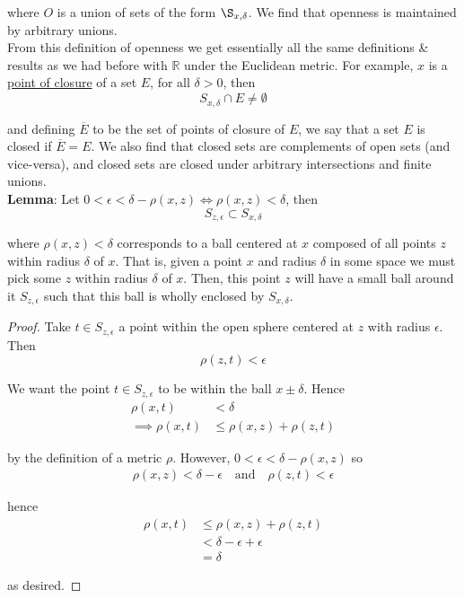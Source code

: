 \documentclass[12pt]{article}
\newlength\tindent
\renewcommand{\indent}{\hspace*{\tindent}}
\newcommand{\R}{\mathbb R}
\begin{document}
where $O$ is a union of sets of the form $\S_{x,\delta}$. We find that openness is maintained by arbitrary unions. \\

\indent From this definition of openness we get essentially all the same definitions \& results as we had before with $\R$ under the Euclidean metric. For example, $x$ is a \underline{point of closure} of a set $E$, for all $\delta > 0$, then
\begin{equation*}
	S_{x,\delta} \cap E \neq \emptyset
\end{equation*}

and defining $\overline{E}$ to be the set of points of closure of $E$, we say that a set $E$ is closed if $\overline{E} = E$. We also find that closed sets are complements of open sets (and vice-versa), and closed sets are closed under arbitrary intersections and finite unions. \\

%
%
{\bf Lemma}: Let $0 < \epsilon < \delta - \rho(x, z) \iff \rho(x, z) < \delta$, then
\begin{equation*}
	S_{z,\epsilon} \subset S_{x,\delta}
\end{equation*}

where $\rho(x, z) < \delta$ corresponds to a ball centered at $x$ composed of all points $z$ within radius $\delta$ of $x$. That is, given a point $x$ and radius $\delta$ in some space we must pick some $z$ within radius $\delta$ of $x$. Then, this point $z$ will have a small ball around it $S_{z,\epsilon}$ such that this ball is wholly enclosed by $S_{x,\delta}$. \\

\begin{proof} Take $t \in S_{z,\epsilon}$ a point within the open sphere centered at $z$ with radius $\epsilon$. Then
\begin{equation*}
	\rho(z, t) < \epsilon
\end{equation*}

We want the point $t \in S_{z,\epsilon}$ to be within the ball $x \pm \delta$. Hence
\begin{align*}
	\rho(x, t) &< \delta \\
	\implies \rho(x, t) &\leq \rho(x, z) + \rho(z, t)
\end{align*}

by the definition of a metric $\rho$. However, $0 < \epsilon < \delta - \rho(x, z)$ so
\begin{align*}
	\rho(x, z) < \delta - \epsilon \quad \text{and} \quad \rho(z, t) < \epsilon
\end{align*}

hence
\begin{align*}
	\rho(x,t) &\leq \rho(x, z) + \rho(z, t) \\
	&< \delta - \epsilon + \epsilon \\
	&= \delta
\end{align*}

as desired.
\end{proof}
\end{document}
